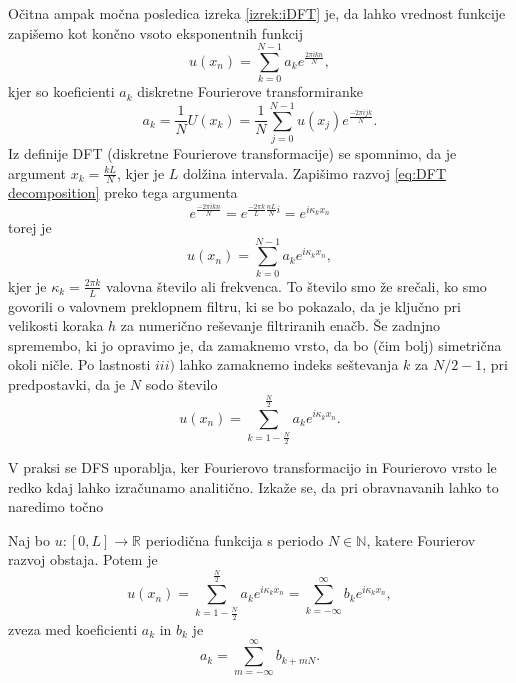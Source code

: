 \documentclass[mat2, tisk]{fmfdelo}
\newcommand{\R}{\mathbb R}
\newcommand{\N}{\mathbb N}
\begin{document}
Očitna ampak močna posledica izreka \ref{izrek:iDFT} je, da lahko 
vrednost funkcije zapišemo kot končno vsoto eksponentnih funkcij 
\begin{equation}
  \label{eq:DFT decomposition}
u(x_n) = \sum_{k=0}^{N-1} a_k e^{\frac{2\pi i k n}{N}},
\end{equation}
kjer so koeficienti $a_k$ diskretne Fourierove transformiranke 
\begin{equation}
a_k = \frac{1}{N} U(x_k) = \frac{1}{N} \sum_{j=0}^{N-1} u(x_j) e^{\frac{-2\pi i j k}{N}}.
\end{equation}
Iz definije DFT (diskretne Fourierove transformacije) se spomnimo, da je 
argument $x_k = \frac{k L}{N}$, kjer je $L$ dolžina intervala. Zapišimo 
razvoj \ref{eq:DFT decomposition} preko tega argumenta 
$$
e^{\frac{-2\pi i k n}{N}} = e^{\frac{-2\pi k}{L}\frac{nL}{N}i} = e^{i\kappa_k x_n}
$$
torej je 
\begin{equation}
u(x_n) = \sum_{k=0}^{N-1} a_k e^{i\kappa_k x_n},
\end{equation}
kjer je $\kappa_k = \frac{2\pi k}{L}$ valovna število ali frekvenca.
To število smo že srečali, ko smo govorili o valovnem preklopnem 
filtru, ki se bo pokazalo, da je ključno pri velikosti koraka $h$ 
za numerično reševanje filtriranih enačb. Še zadnjno spremembo, ki 
jo opravimo je, da zamaknemo vrsto, da bo (čim bolj) simetrična okoli ničle. 
Po lastnosti $iii)$ lahko zamaknemo indeks seštevanja $k$ za $N/2 - 1$, pri 
predpostavki, da je $N$ sodo število
\begin{equation}
u(x_n) = \sum_{k=1-\frac{N}{2}}^{\frac{N}{2}} a_k e^{i\kappa_k x_n}.
\end{equation} 

V praksi se DFS uporablja, ker Fourierovo transformacijo in 
Fourierovo vrsto le redko kdaj lahko izračunamo analitično.
Izkaže se, da pri obravnavanih lahko to naredimo točno 
\begin{izrek}
Naj bo $u: [0, L] \rightarrow \R$ periodična funkcija s periodo $N\in \N$, katere Fourierov 
razvoj obstaja. Potem je 
\begin{equation}
u(x_n) = \sum_{k=1-\frac{N}{2}}^{\frac{N}{2}} a_k e^{i\kappa_k x_n} =
\sum_{k=-\infty}^{\infty} b_k e^{i\kappa_k x_n},
\end{equation}
zveza med koeficienti $a_k$ in $b_k$ je
\begin{equation}
  a_k = \sum_{m=-\infty}^{\infty} b_{k + mN}. 
\end{equation}
\end{izrek}
\end{document}
